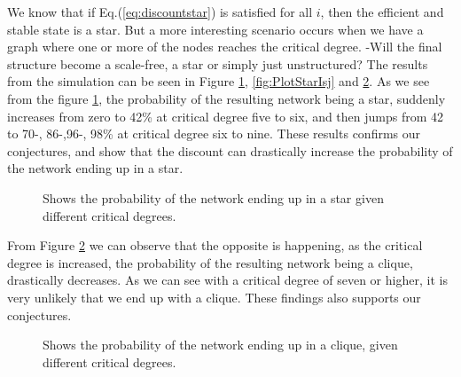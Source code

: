 We know that if Eq.(\ref{eq:discountstar}) is satisfied for all $i$, then the efficient and stable state is a star. But a more interesting scenario occurs when we have a graph where one or more of the nodes reaches the critical degree. -Will the final structure become a scale-free, a star or simply just unstructured? 
The results from the simulation can be seen in Figure \ref{fig:PlotStar}, \ref{fig:PlotStarIsj} and \ref{fig:PlotClique}. As we see from the figure \ref{fig:PlotStar}, the probability of the resulting network being a star, suddenly increases from zero to 42\% at critical degree five to six, and then jumps from 42 to 70-, 86-,96-, 98\% at critical degree six to nine. These results confirms our conjectures, and show that the discount can drastically increase the probability of the network ending up in a star. 

\begin{figure}
\centering
{}
\caption{\label{fig:PlotStar} Shows the probability of the network ending up in a star given different critical degrees.}
\end{figure}

From Figure \ref{fig:PlotClique} we can observe that the opposite is happening, as the critical degree is increased, the probability of the resulting network being a clique, drastically decreases. As we can see with a critical degree of seven or higher, it is very unlikely that we end up with a clique. These findings also supports our conjectures.

\begin{figure}
\centering
{}
\caption{\label{fig:PlotClique} Shows the probability of the network ending up in a clique, given different critical degrees.}
\end{figure}

